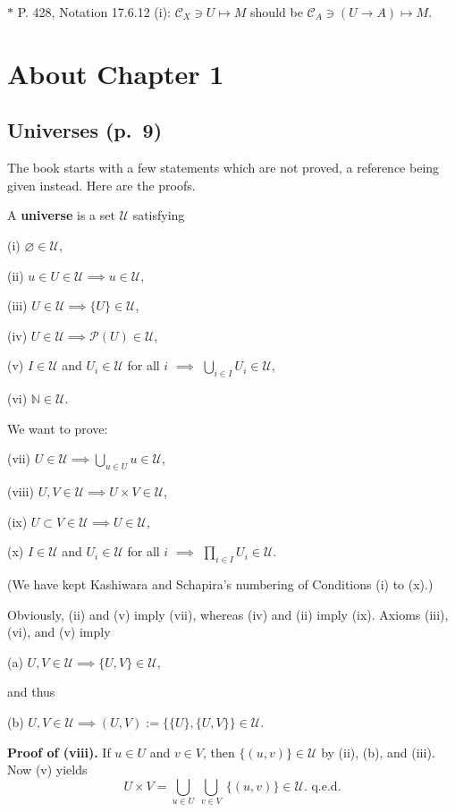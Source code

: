 \documentclass[12pt]{article}
\theoremstyle{remark}
\theoremstyle{definition}
\newcommand{\C}{\mathcal C}
\begin{document}
\noindent $*$ P. 428, Notation 17.6.12 (i): $\C_X\ni U\mapsto M$ should be $\C_A\ni(U\to A)\mapsto M$.
%
\section{About Chapter 1}
%
%
\subsection{Universes (p.~9)}
%
The book starts with a few statements which are not proved, a reference being given instead. Here are the proofs.

A \textbf{universe} is a set $\mathcal U$ satisfying 

(i) $\varnothing\in\mathcal U$,

(ii) $u\in U\in\mathcal U\implies u\in \mathcal U$,

(iii) $U\in\mathcal U\implies\{U\}\in\mathcal U$,

(iv) $U\in\mathcal U\implies\mathcal P(U)\in\mathcal U$,

(v) $I\in\mathcal U$ and $U_i\in\mathcal U$ for all $i$ $\implies$ $\bigcup_{i\in I}U_i\in\mathcal U$,

(vi) $\mathbb N\in\mathcal U$.

\noindent We want to prove:

(vii) $U\in\mathcal U\implies\bigcup_{u\in U}u\in\mathcal U$,

(viii) $U,V\in\mathcal U\implies U\times V\in\mathcal U$,

(ix) $U\subset V\in\mathcal U\implies U\in\mathcal U$,

(x) $I\in \mathcal U$ and $U_i\in\mathcal U$ for all $i$ $\implies$ $\prod_{i\in I}U_i\in\mathcal U$.

\noindent(We have kept Kashiwara and Schapira's numbering of Conditions (i) to (x).) 

\noindent Obviously, (ii) and (v) imply (vii), whereas (iv) and (ii) imply (ix). Axioms (iii), (vi), and (v) imply

(a) $U,V\in\mathcal U\implies\{U,V\}\in\mathcal U$,

\noindent and thus

(b) $U,V\in\mathcal U\implies(U,V):=\{\{U\},\{U,V\}\}\in\mathcal U$.

\noindent\textbf{Proof of (viii).} If $u\in U$ and $v\in V$, then $\{(u,v)\}\in\mathcal U$ by (ii), (b), and (iii). Now (v) yields 
$$
U\times V=\bigcup_{u\in U}\ \bigcup_{v\in V}\ \{(u,v)\}\in\mathcal U.\text{ q.e.d.} 
$$ 
\end{document}

